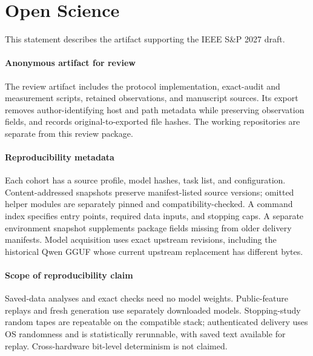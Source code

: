 \section{Open Science}
\label{sec:open-science}

This statement describes the artifact supporting the IEEE S\&P 2027 draft.

\paragraph{Anonymous artifact for review}
The review artifact includes the protocol implementation, exact-audit and
measurement scripts, retained observations, and manuscript sources. Its export
removes author-identifying host and path metadata while preserving observation
fields, and records original-to-exported file hashes. The working repositories
are separate from this review package.

\paragraph{Reproducibility metadata}
Each cohort has a source profile, model hashes, task list, and configuration.
Content-addressed snapshots preserve manifest-listed source versions;
omitted helper modules are separately pinned and compatibility-checked.
A command index specifies entry points, required data inputs, and stopping caps. A separate
environment snapshot supplements package fields missing from older delivery
manifests. Model acquisition uses exact upstream revisions, including the
historical Qwen GGUF whose current upstream replacement has different bytes.

\paragraph{Scope of reproducibility claim}
Saved-data analyses and exact checks need no model weights. Public-feature
replays and fresh generation use separately downloaded models. Stopping-study
random tapes are repeatable on the compatible stack; authenticated delivery
uses OS randomness and is statistically rerunnable, with saved text available
for replay. Cross-hardware bit-level determinism is not claimed.

